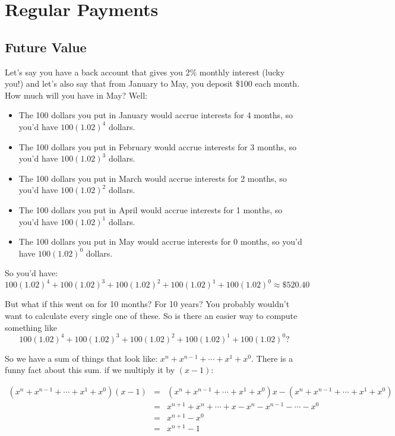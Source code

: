 \section{Regular Payments}\label{Section:RegularPayments}

\subsection{Future Value}

Let's say you have a back account that gives you 2\% monthly interest (lucky you!)  and let's also say that from January to May, you deposit \$100 each month.  How much will you have in May? Well:

\begin{itemize}
\item The 100 dollars you put in January would accrue interests for 4 months, so you'd have $100(1.02)^4$ dollars.
\item The 100 dollars you put in February would accrue interests for 3 months, so you'd have $100(1.02)^3$ dollars.
\item The 100 dollars you put in March would accrue interests for 2 months, so you'd have $100(1.02)^2$ dollars.
\item The 100 dollars you put in April would accrue interests for 1 months, so you'd have $100(1.02)^1$ dollars.
\item The 100 dollars you put in May would accrue interests for 0 months, so you'd have $100(1.02)^0$ dollars.
\end{itemize}

So you'd have: $$100(1.02)^4+100(1.02)^3+100(1.02)^2+100(1.02)^1+100(1.02)^0\approx \$520.40$$

But what if this went on for 10 months?  For 10 years?  You probably wouldn't want to calculate every single one of these.  So is there an easier way to compute something like $$100(1.02)^4+100(1.02)^3+100(1.02)^2+100(1.02)^1+100(1.02)^0?$$

So we have a sum of things that look like: $x^n+x^{n-1}+\cdots+x^1+x^0$.  There is a funny fact about this sum.  if we multiply it by $(x-1)$:

\begin{eqnarray*}
(x^n+x^{n-1}+\cdots+x^1+x^0)(x-1)&=&(x^n+x^{n-1}+\cdots+x^1+x^0)x-(x^n+x^{n-1}+\cdots+x^1+x^0)\\
&=&x^{n+1}+x^n+\cdots+x-x^n-x^{n-1}-\cdots-x^0\\
&=&x^{n+1}-x^0\\
&=&x^{n+1}-1
\end{eqnarray*}

